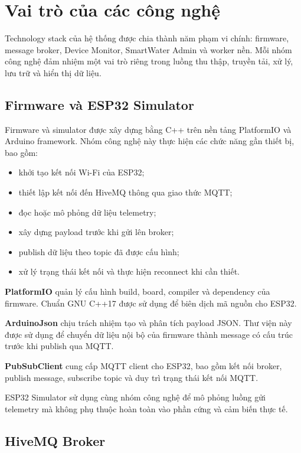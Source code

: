 \section{Vai trò của các công nghệ}

Technology stack của hệ thống được chia thành năm phạm vi chính: firmware,
message broker, Device Monitor, SmartWater Admin và worker nền. Mỗi nhóm công
nghệ đảm nhiệm một vai trò riêng trong luồng thu thập, truyền tải, xử lý, lưu
trữ và hiển thị dữ liệu.

\subsection{Firmware và ESP32 Simulator}

Firmware và simulator được xây dựng bằng C++ trên nền tảng PlatformIO và
Arduino framework. Nhóm công nghệ này thực hiện các chức năng gần thiết bị,
bao gồm:

\begin{itemize}
    \item khởi tạo kết nối Wi-Fi của ESP32;
    \item thiết lập kết nối đến HiveMQ thông qua giao thức MQTT;
    \item đọc hoặc mô phỏng dữ liệu telemetry;
    \item xây dựng payload trước khi gửi lên broker;
    \item publish dữ liệu theo topic đã được cấu hình;
    \item xử lý trạng thái kết nối và thực hiện reconnect khi cần thiết.
\end{itemize}

\textbf{PlatformIO} quản lý cấu hình build, board, compiler và dependency của
firmware. Chuẩn GNU C++17 được sử dụng để biên dịch mã nguồn cho ESP32.

\textbf{ArduinoJson} chịu trách nhiệm tạo và phân tích payload JSON. Thư viện
này được sử dụng để chuyển dữ liệu nội bộ của firmware thành message có cấu
trúc trước khi publish qua MQTT.

\textbf{PubSubClient} cung cấp MQTT client cho ESP32, bao gồm kết nối broker,
publish message, subscribe topic và duy trì trạng thái kết nối MQTT.

ESP32 Simulator sử dụng cùng nhóm công nghệ để mô phỏng luồng gửi telemetry
mà không phụ thuộc hoàn toàn vào phần cứng và cảm biến thực tế.

\subsection{HiveMQ Broker}


